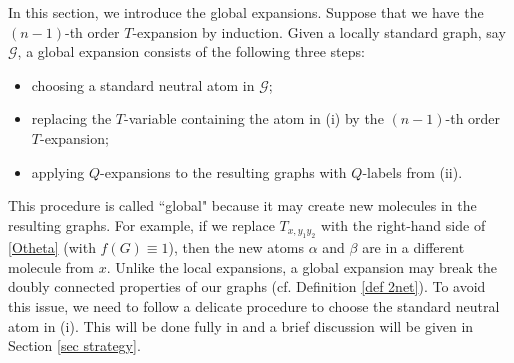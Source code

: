 \documentclass{article}
\newcommand{\1}{\mathds{1}}
\numberwithin{equation}{section}
\newcommand{\al}{\alpha}
\renewcommand{\cal}{\mathcal}
\newcommand{\renormal}{\text{self-energy renormalization}}
\theoremstyle{plain} %
\theoremstyle{remark}
\newcommand{\cor}{\color{red}}
\newcommand{\hty}[1]{{\cor (ht: #1) }}
\begin{document}
In this section, we introduce the global expansions. Suppose that we have the $(n-1)$-th order $T$-expansion by induction. Given a locally standard graph, say $\cal G$, a global expansion consists of the following three steps:
\begin{itemize}
	\item[(i)] choosing a standard neutral atom in $\cal G$;
	\item[(ii)] replacing the $T$-variable containing the atom in (i) by the $(n-1)$-th order $T$-expansion;
	\item[(iii)] applying $Q$-expansions to the resulting graphs with $Q$-labels  from (ii).
\end{itemize}
This procedure %
is called ``global" because it may %
create new molecules in the resulting graphs. For example, if we replace $T_{x,y_1y_2}$ with the right-hand side of \eqref{Otheta} (with $f(G)\equiv 1$), then the new atoms $\al$ and $\beta$ are in a different molecule from $x$. Unlike the local expansions, a global expansion %
may break the doubly connected properties of our graphs (cf. Definition \ref{def 2net}). To avoid this issue,
we need to follow a delicate procedure to choose the standard neutral atom in (i). This will be done fully in \cite{PartII_high} and a brief discussion will be given in Section \ref{sec strategy}. %

 
\end{document}
